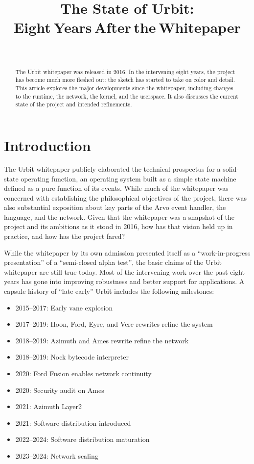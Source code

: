 \documentclass[twoside]{article}
\title{The State of Urbit:\\Eight Years After the Whitepaper}
\author{\authorname~\authorpatp \\ \affiliation}
\date{}
\begin{document}
\maketitle
\thispagestyle{firststyle}

\begin{abstract}
\sloppy
The Urbit whitepaper was released in 2016.  In the intervening eight years, the project has become much more fleshed out:  the sketch has started to take on color and detail.  This article explores the major developments since the whitepaper, including changes to the runtime, the network, the kernel, and the userspace.  It also discusses the current state of the project and intended refinements.
\end{abstract}

\setcounter{page}{1}

\tableofcontents

\section{Introduction}

The Urbit whitepaper \citep{Whitepaper} publicly elaborated the technical prospectus for a solid-state operating function, an operating system built as a simple state machine defined as a pure function of its events.  While much of the whitepaper was concerned with establishing the philosophical objectives of the project, there was also substantial exposition about key parts of the Arvo event handler, the language, and the network.  Given that the whitepaper was a snapshot of the project and its ambitions as it stood in 2016, how has that vision held up in practice, and how has the project fared?

While the whitepaper by its own admission presented itself as a ``work-in-progress presentation'' of a ``semi-closed alpha test'', the basic claims of the Urbit whitepaper are still true today.  Most of the intervening work over the past eight years has gone into improving robustness and better support for applications.  A capsule history of ``late early'' Urbit includes the following milestones:
\begin{itemize}
  \item  2015–2017:  Early vane explosion
  \item  2017–2019:  Hoon, Ford, Eyre, and Vere rewrites refine the system
  \item  2018–2019:  Azimuth and Ames rewrite refine the network
  \item  2018–2019:  Nock bytecode interpreter
  \item  2020:  Ford Fusion enables network continuity
  \item  2020:  Security audit on Ames
  \item  2021:  Azimuth Layer2
  \item  2021:  Software distribution introduced
  \item  2022–2024:  Software distribution maturation
  \item  2023–2024:  Network scaling
\end{itemize}
\end{document}
